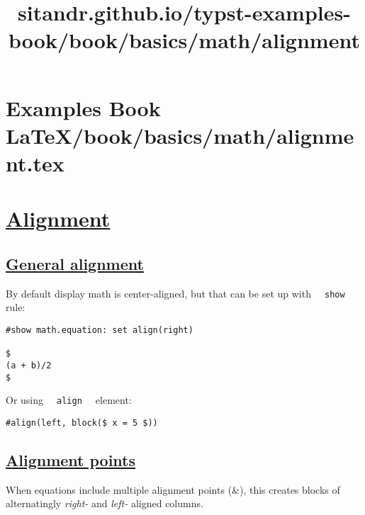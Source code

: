 \pandocbounded{}


\section{Examples Book LaTeX/book/basics/math/alignment.tex}
\title{sitandr.github.io/typst-examples-book/book/basics/math/alignment}

\section{\texorpdfstring{\hyperref[alignment]{Alignment}}{Alignment}}\label{alignment}

\subsection{\texorpdfstring{\hyperref[general-alignment]{General
alignment}}{General alignment}}\label{general-alignment}

By default display math is center-aligned, but that can be set up with
\texttt{\ }{\texttt{\ show\ }}\texttt{\ } rule:

\begin{verbatim}
#show math.equation: set align(right)

$
(a + b)/2
$
\end{verbatim}

\pandocbounded{}

Or using \texttt{\ }{\texttt{\ align\ }}\texttt{\ } element:

\begin{verbatim}
#align(left, block($ x = 5 $))
\end{verbatim}

\pandocbounded{}

\subsection{\texorpdfstring{\hyperref[alignment-points]{Alignment
points}}{Alignment points}}\label{alignment-points}

When equations include multiple alignment points (\&), this creates
blocks of alternatingly \emph{right-} and \emph{left-} aligned columns.

